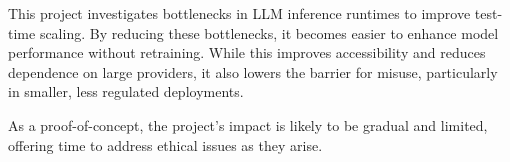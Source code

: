 \documentclass[11pt,twoside]{report}
\begin{document}
This project investigates bottlenecks in LLM inference runtimes to improve test-time scaling. 
By reducing these bottlenecks, it becomes easier to enhance model performance without retraining. 
While this improves accessibility and reduces dependence on large providers, it also lowers the barrier for misuse, particularly in smaller, less regulated deployments.

As a proof-of-concept, the project’s impact is likely to be gradual and limited, offering time to address ethical issues as they arise.
\end{document}

